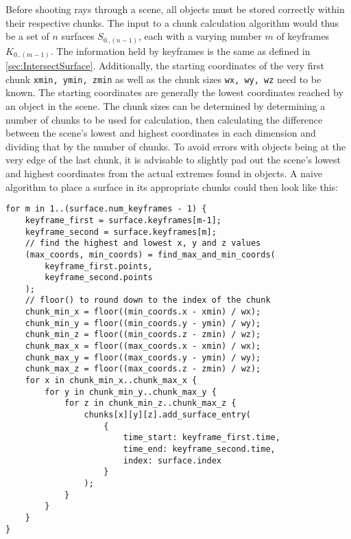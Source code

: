 Before shooting rays through a scene,
all objects must be stored correctly within their respective chunks.
The input to a chunk calculation algorithm would thus be a set of \(n\) surfaces \(S_{0..(n-1)}\),
each with a varying number \(m\) of keyframes \(K_{0..(m-1)}\).
The information held by keyframes is the same as defined in \autoref{sec:IntersectSurface}.
\newline
Additionally, the starting coordinates of the very first chunk \verb|xmin, ymin, zmin|
as well as the chunk sizes \verb|wx, wy, wz| need to be known.
The starting coordinates are generally the lowest coordinates reached by an object in the scene.
The chunk sizes can be determined by determining a number of chunks to be used for calculation,
then calculating the difference between the scene's lowest and highest coordinates in each dimension
and dividing that by the number of chunks.
To avoid errors with objects being at the very edge of the last chunk,
it is advisable to slightly pad out the scene's lowest and highest coordinates
from the actual extremes found in objects.
\newline
A naive algorithm to place a surface in its appropriate chunks could then look like this:

\begin{verbatim}
for m in 1..(surface.num_keyframes - 1) {
    keyframe_first = surface.keyframes[m-1];
    keyframe_second = surface.keyframes[m];
    // find the highest and lowest x, y and z values
    (max_coords, min_coords) = find_max_and_min_coords(
        keyframe_first.points,
        keyframe_second.points
    );
    // floor() to round down to the index of the chunk
    chunk_min_x = floor((min_coords.x - xmin) / wx);
    chunk_min_y = floor((min_coords.y - ymin) / wy);
    chunk_min_z = floor((min_coords.z - zmin) / wz);
    chunk_max_x = floor((max_coords.x - xmin) / wx);
    chunk_max_y = floor((max_coords.y - ymin) / wy);
    chunk_max_z = floor((max_coords.z - zmin) / wz);
    for x in chunk_min_x..chunk_max_x {
        for y in chunk_min_y..chunk_max_y {
            for z in chunk_min_z..chunk_max_z {
                chunks[x][y][z].add_surface_entry(
                    {
                        time_start: keyframe_first.time,
                        time_end: keyframe_second.time,
                        index: surface.index
                    }
                );
            }
        }
    }
}
\end{verbatim}

